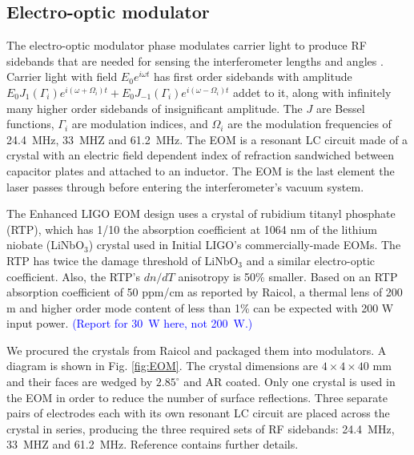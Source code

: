 \subsection{Electro-optic modulator} 
The electro-optic modulator phase modulates carrier light to produce
RF sidebands that are needed for sensing the interferometer lengths
and angles \cite{Fritschel2001Readout}. Carrier light with field $E_0
e^{i \omega t}$ has first order sidebands with amplitude $E_0
J_1(\Gamma_i) e^{i (\omega + \Omega_i) t} + E_0 J_{-1}(\Gamma_i) e^{i
  (\omega - \Omega_i) t}$ addet to it, along with infinitely many
higher order sidebands of insignificant amplitude. The $J$ are Bessel
functions, $\Gamma_i$ are modulation indices, and $\Omega_i$ are the
modulation frequencies of 24.4~MHz, 33~MHZ and 61.2~MHz. The EOM is a
resonant LC circuit made of a crystal with an electric field dependent
index of refraction sandwiched between capacitor plates and attached
to an inductor. The EOM is the last element the laser passes through
before entering the interferometer's vacuum system.

The Enhanced LIGO EOM design uses a crystal of rubidium titanyl
phosphate (RTP), which has 1/10 the absorption coefficient at 1064 nm
of the lithium niobate (LiNbO$_3$) crystal used in Initial LIGO's
commercially-made EOMs. The RTP has twice the damage threshold of
LiNbO$_3$ and a similar electro-optic coefficient. Also, the RTP's
$dn/dT$ anisotropy is 50\% smaller. Based on an RTP absorption
coefficient of 50 ppm/cm as reported by Raicol, a thermal lens of 200
m and higher order mode content of less than 1\% can be expected with
200 W input power. \textcolor{blue}{(Report for 30~W here, not
  200~W.)}

We procured the crystals from Raicol and packaged them into
modulators. A diagram is shown in Fig. \ref{fig:EOM}. The crystal
dimensions are $4 \times 4 \times 40$ mm and their faces are wedged by
$2.85^\circ$ and AR coated. Only one crystal is used in the EOM in
order to reduce the number of surface reflections. Three separate
pairs of electrodes each with its own resonant LC circuit are placed
across the crystal in series, producing the three required sets of RF
sidebands: 24.4~MHz, 33~MHZ and 61.2~MHz. Reference
\cite{Quetschke2008ElectroOptic} contains further details.

